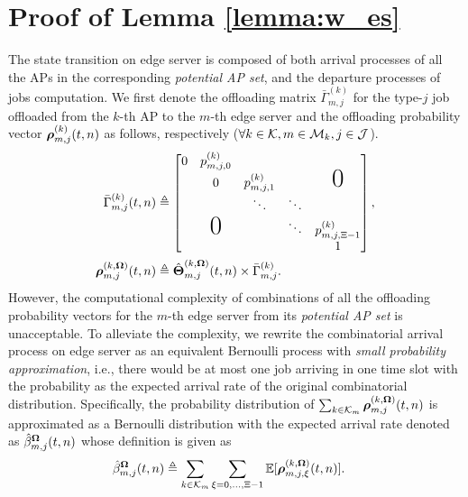 \section{ Proof of Lemma \ref{lemma:w_es} }
\label{append_2}
The state transition on edge server is composed of both arrival processes of all the APs in the corresponding \emph{potential AP set}, and the departure processes of jobs computation.
We first denote the offloading matrix $\bar{\Gamma}^{(k)}_{m,j}$ for the type-$j$ job offloaded from the $k$-th AP to the $m$-th edge server and the offloading probability vector $\boldsymbol{\rho}^{(k)}_{m,j}({t,n})$ as follows, respectively ($\forall k\in\mathcal{K}, m\in\mathcal{M}_{k}, j\in\mathcal{J}$).
\begin{align}
    \bar{\Gamma}^{(k)}_{m,j}(t,n) &\define
    \begin{bmatrix}
        0 & p^{(k)}_{m,j,0} &                 &        &                     \\
        & 0                 & p^{(k)}_{m,j,1} &        & \text{\huge0}       \\
        &                   & \ddots          & \ddots &                     \\
        & \text{\huge0}     &                 & \ddots & p^{(k)}_{m,j,\Xi-1} \\
        &                   &                 &        & 1                   \\
    \end{bmatrix},
    \\
    \vecG{\rho}^{(k, \Policy)}_{m,j}({t,n}) &\define \hat{\vecG{\Theta}}^{(k, \Policy)}_{m,j}({t,n}) \times \bar{\Gamma}^{(k)}_{m,j}.
\end{align}
However, the computational complexity of combinations of all the offloading probability vectors for the $m$-th edge server from its \emph{potential AP set} is unacceptable.
To alleviate the complexity, we rewrite the combinatorial arrival process on edge server as an equivalent Bernoulli process with \emph{small probability approximation}, i.e., there would be at most one job arriving in one time slot with the probability as the expected arrival rate of the original combinatorial distribution.
Specifically, the probability distribution of $\sum_{k\in\mathcal{K}_{m}} \boldsymbol{\rho}^{(k, \boldsymbol{\Omega})}_{m,j}({t,n})$ is approximated as a Bernoulli distribution with the expected arrival rate denoted as $\hat{\beta}^{\boldsymbol{\Omega}}_{m,j}({t,n})$ whose definition is given as
\begin{align}
    \hat{\beta}^{\boldsymbol{\Omega}}_{m,j}({t,n}) &\triangleq \sum_{k\in\mathcal{K}_{m}} \sum_{\xi=0,\dots,\Xi-1} \mathbb{E}[\boldsymbol{\rho}^{(k, \boldsymbol{\Omega})}_{m,j,\xi}({t,n})].
    \label{eqn_0}
\end{align}

